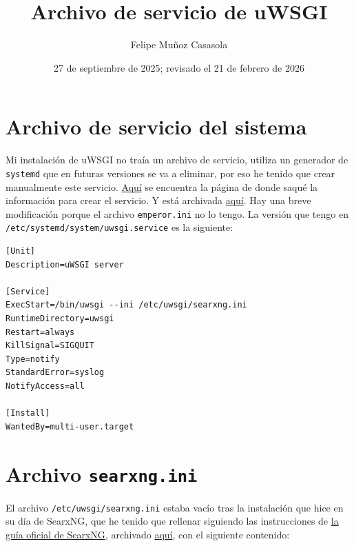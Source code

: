 \documentclass{article}
\title{Archivo de servicio de uWSGI}
\author{Felipe Muñoz Casasola}
\date{27 de septiembre de 2025; revisado el 21 de febrero de 2026}
\begin{document}
\maketitle
\clearpage

\section{Archivo de servicio del sistema}
Mi instalación de uWSGI no traía un archivo de servicio, utiliza un generador de \texttt{systemd} que en futuras versiones se va a eliminar, por eso he tenido que crear manualmente este servicio. \href{https://uwsgi.readthedocs.io/en/latest/Systemd.html}{Aquí} se encuentra la página de donde saqué la información para crear el servicio. Y está archivada \href{https://web.archive.org/web/20250927100911/https://uwsgi.readthedocs.io/en/latest/Systemd.html}{aquí}. Hay una breve modificación porque el archivo \texttt{emperor.ini} no lo tengo. La versión que tengo en \texttt{/etc/systemd/system/uwsgi.service} es la siguiente:

\begin{verbatim}
[Unit]
Description=uWSGI server

[Service]
ExecStart=/bin/uwsgi --ini /etc/uwsgi/searxng.ini
RuntimeDirectory=uwsgi
Restart=always
KillSignal=SIGQUIT
Type=notify
StandardError=syslog
NotifyAccess=all

[Install]
WantedBy=multi-user.target
\end{verbatim}

\section{Archivo \texttt{searxng.ini}}
El archivo \texttt{/etc/uwsgi/searxng.ini} estaba vacío tras la instalación que hice en su día de SearxNG, que he tenido que rellenar siguiendo las instrucciones de \href{https://docs.searxng.org/admin/installation-uwsgi.html}{la guía oficial de SearxNG}, archivado \href{https://web.archive.org/web/20250927123518/https://docs.searxng.org/admin/installation-uwsgi.html}{aquí}, con el siguiente contenido:
\end{document}
